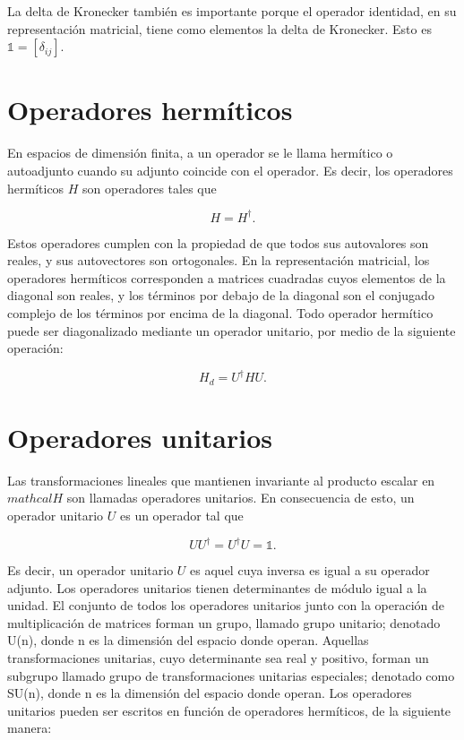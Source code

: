 La delta de Kronecker también es importante porque el operador identidad, en su representación matricial, tiene como elementos la delta de Kronecker. Esto es $\mathds{1} = [\delta_{ij}]$.

\section{Operadores hermíticos}

En espacios de dimensión finita, a un operador se le llama hermítico o autoadjunto cuando su adjunto coincide con el operador. Es decir, los operadores hermíticos $H$ son operadores tales que

\begin{equation}
    H = H^\dagger .
\end{equation}

Estos operadores cumplen con la propiedad de que todos sus autovalores son reales, y sus autovectores son ortogonales. En la representación matricial, los operadores hermíticos corresponden a matrices cuadradas cuyos elementos de la diagonal son reales, y los términos por debajo de la diagonal son el conjugado complejo de los términos por encima de la diagonal. Todo operador hermítico puede ser diagonalizado mediante un operador unitario, por medio de la siguiente operación:

\begin{equation}
    H_d = U^\dagger H U .
\end{equation}

\section{Operadores unitarios}

Las transformaciones lineales que mantienen invariante al producto escalar en $mathcal{H}$ son llamadas operadores unitarios. En consecuencia de esto, un operador unitario $U$ es un operador tal que

\begin{equation}
    U U^\dagger = U^\dagger U = \mathds{1} .
\end{equation}

Es decir, un operador unitario $U$ es aquel cuya inversa es igual a su operador adjunto. Los operadores unitarios tienen determinantes de módulo igual a la unidad. El conjunto de todos los operadores unitarios junto con la operación de multiplicación de matrices forman un grupo, llamado grupo unitario; denotado U(n), donde n es la dimensión del espacio donde operan. Aquellas transformaciones unitarias, cuyo determinante sea real y positivo, forman un subgrupo llamado grupo de transformaciones unitarias especiales; denotado como SU(n), donde n es la dimensión del espacio donde operan. Los operadores unitarios pueden ser escritos en función de operadores hermíticos, de la siguiente manera:

